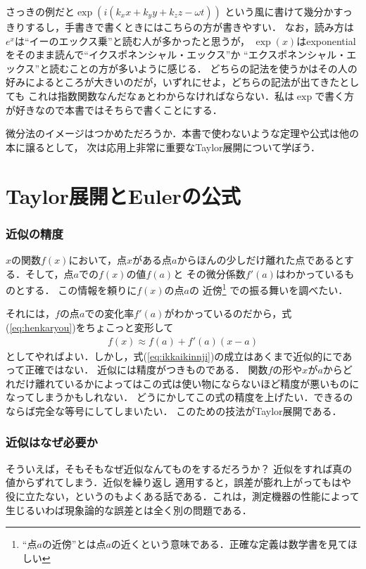 さっきの例だと$\exp (i(k_x x + k_y y + k_z z - \omega t))$
という風に書けて幾分かすっきりするし，手書きで書くときにはこちらの方が書きやすい．
なお，読み方は$e^x$は``イーのエックス乗''と読む人が多かったと思うが，
$\exp (x)$はexponentialをそのまま読んで``イクスポネンシャル・エックス''か
``エクスポネンシャル・エックス''と読むことの方が多いように感じる．
どちらの記法を使うかはその人の好みによるところが大きいのだが，いずれにせよ，どちらの記法が出てきたとしても
これは指数関数なんだなぁとわからなければならない．私は$\exp$で書く方が好きなので本書ではそちらで書くことにする．

微分法のイメージはつかめただろうか．本書で使わないような定理や公式は他の本に譲るとして，
次は応用上非常に重要なTaylor展開について学ぼう．

\section{{\rm Taylor}展開と{\rm Euler}の公式}
\subsubsection{近似の精度}
$x$の関数$f(x)$において，点$x$がある点$a$からほんの少しだけ離れた点であるとする．そして，点$a$での$f(x)$の値$f(a)$と
その微分係数$f'(a)$はわかっているものとする．
この情報を頼りに$f(x)$の点$a$の
近傍\footnote{``点$a$の近傍''とは点$a$の近くという意味である．正確な定義は数学書を見てほしい}
での振る舞いを調べたい．

それには，$f$の点$a$での変化率$f'(a)$がわかっているのだから，式(\ref{eq:henkaryou})をちょこっと変形して
\begin{align}
f(x) \approx f(a) + f'(a)(x-a)
\label{eq:ikkaikinnji}
\end{align}
としてやればよい．しかし，式(\ref{eq:ikkaikinnji})の成立はあくまで近似的にであって正確ではない．
近似には精度がつきものである．
関数$f$の形や$x$が$a$からどれだけ離れているかによってはこの式は使い物にならないほど精度が悪いものになってしまうかもしれない．
どうにかしてこの式の精度を上げたい．できるのならば完全な等号にしてしまいたい．
このための技法がTaylor展開である．

\subsubsection{近似はなぜ必要か}
そういえば，そもそもなぜ近似なんてものをするだろうか？ 近似をすれば真の値からずれてしまう．近似を繰り返し
適用すると，誤差が膨れ上がってもはや役に立たない，というのもよくある話である．これは，測定機器の性能によって
生じるいわば現象論的な誤差とは全く別の問題である．

